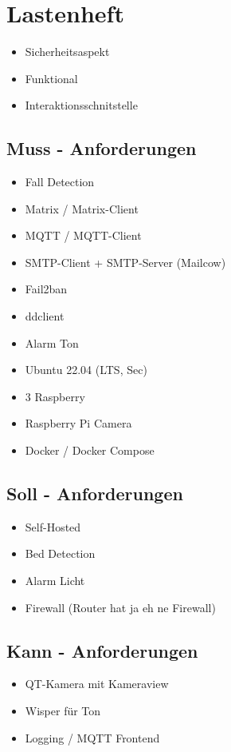 \section{Lastenheft}
\begin{itemize}
    \item Sicherheitsaspekt
    \item Funktional 
    \item Interaktionsschnitstelle
\end{itemize}

\subsection{Muss - Anforderungen}
\begin{itemize}
  \item  Fall Detection
  \item  Matrix / Matrix-Client
  \item  MQTT / MQTT-Client
  \item  SMTP-Client + SMTP-Server (Mailcow)
  \item  Fail2ban
  \item ddclient
  \item Alarm Ton
  \item Ubuntu 22.04 (LTS, Sec)
  \item  3 Raspberry
  \item  Raspberry Pi Camera
  \item Docker / Docker Compose
\end{itemize}


\subsection{Soll - Anforderungen}
\begin{itemize}
  \item Self-Hosted
  \item  Bed Detection
  \item Alarm Licht
  \item Firewall (Router hat ja eh ne Firewall)
\end{itemize}

\subsection{Kann - Anforderungen}

\begin{itemize}
  \item QT-Kamera mit Kameraview
  \item Wisper für Ton
  \item Logging / MQTT Frontend
\end{itemize}